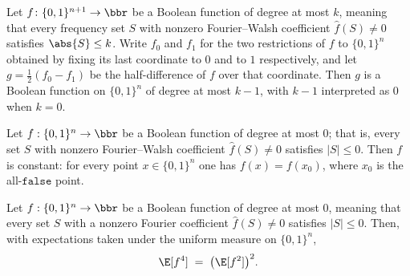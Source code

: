 \begin{lemma}
\label{BooleanAnalysis.Hypercontractivity.degree_diffLast}
\leanok
{}
Let $f\colon\{0,1\}^{n+1}\to\bbr$ be a Boolean function of degree at most $k$, meaning
that every frequency set $S$ with nonzero Fourier--Walsh coefficient $\hat f(S)\ne 0$
satisfies $\abs{S}\le k$. Write $f_0$ and $f_1$ for the two restrictions of $f$ to
$\{0,1\}^{n}$ obtained by fixing its last coordinate to $0$ and to $1$ respectively, and
let $g=\tfrac12(f_0-f_1)$ be the half-difference of $f$ over that coordinate. Then $g$
is a Boolean function on $\{0,1\}^{n}$ of degree at most $k-1$, with $k-1$ interpreted
as $0$ when $k=0$.
\end{lemma}

\begin{lemma}
\label{BooleanAnalysis.Hypercontractivity.degree_zero_const}
\leanok
{}
Let $f:\{0,1\}^n\to\bbr$ be a Boolean function of degree at most $0$; that is, every set
$S$ with nonzero Fourier--Walsh coefficient $\hat f(S)\ne 0$ satisfies $|S|\le 0$. Then
$f$ is constant: for every point $x\in\{0,1\}^n$ one has $f(x)=f(x_0)$, where $x_0$ is
the all-$\mathtt{false}$ point.
\end{lemma}

\begin{lemma}
\label{BooleanAnalysis.Hypercontractivity.degree_zero_fourth_moment}
\leanok
{}
Let $f:\{0,1\}^n\to\bbr$ be a Boolean function of degree at most $0$, meaning that every
set $S$ with a nonzero Fourier coefficient $\hat f(S)\ne 0$ satisfies $|S|\le 0$. Then,
with expectations taken under the uniform measure on $\{0,1\}^n$,
\[
  \E[f^4] \;=\; \bigl(\E[f^2]\bigr)^2.
\]
\end{lemma}

